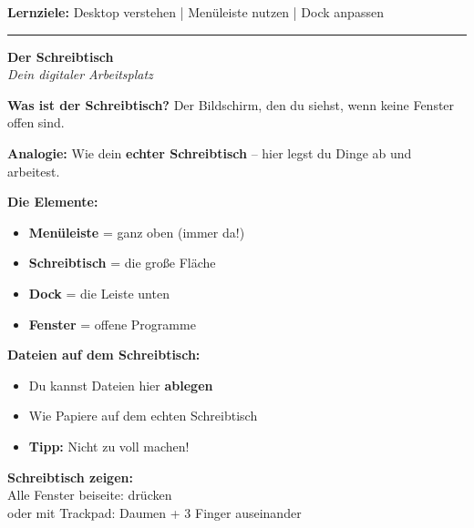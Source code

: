 \documentclass[a4paper,landscape,8pt]{extarticle}
\newcommand{\taste}[1]{\fbox{\small\texttt{#1}}}
\begin{document}

 \hfill
{\footnotesize\textbf{Lernziele:} Desktop verstehen | Menüleiste nutzen | Dock anpassen}

\vspace{1mm}
\hrule
\vspace{1mm}

\begin{minipage}[t]{0.32\linewidth}
\begin{center}
\colorbox{macgray!10}{%
\begin{minipage}{0.95\linewidth}
\vspace{2mm}
\begin{center}
{\Large\bfseries\textcolor{macgray}{Der Schreibtisch}}\\[1pt]
{\footnotesize\itshape Dein digitaler Arbeitsplatz}
\end{center}
\vspace{2mm}
\end{minipage}%
}
\end{center}

\vspace{1mm}

\textbf{Was ist der Schreibtisch?} Der Bildschirm, den du siehst, wenn keine Fenster offen sind.

\textbf{Analogie:} Wie dein \textbf{echter Schreibtisch} -- hier legst du Dinge ab und arbeitest.

\textbf{Die Elemente:}
\begin{itemize}
\item \textbf{Menüleiste} = ganz oben (immer da!)
\item \textbf{Schreibtisch} = die große Fläche
\item \textbf{Dock} = die Leiste unten
\item \textbf{Fenster} = offene Programme
\end{itemize}

\textbf{Dateien auf dem Schreibtisch:}
\begin{itemize}
\item Du kannst Dateien hier \textbf{ablegen}
\item Wie Papiere auf dem echten Schreibtisch
\item \textbf{Tipp:} Nicht zu voll machen!
\end{itemize}

\textbf{Schreibtisch zeigen:}\\
Alle Fenster beiseite: \taste{F11} drücken\\
oder mit Trackpad: Daumen + 3 Finger auseinander

\end{minipage}%
\end{document}
